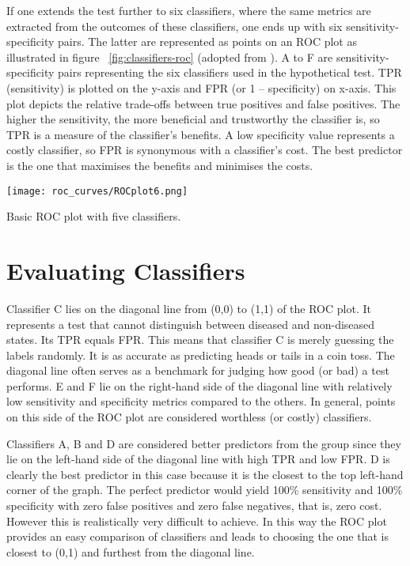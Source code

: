 If one extends the test further to six classifiers, where the same metrics are extracted from the outcomes of these classifiers, one ends up with six sensitivity-specificity pairs. The latter are represented as points on an ROC plot as illustrated in figure ~\ref{fig:classifiers-roc} (adopted from \citet{fawcett2006introroc}). A to F are sensitivity-specificity pairs representing the six classifiers used in the hypothetical test. TPR (sensitivity) is plotted on the y-axis and FPR (or 1 – specificity) on x-axis. This plot depicts the relative trade-offs between true positives and false positives. The higher the sensitivity, the more beneficial and trustworthy the classifier is, so TPR is a measure of the classifier's benefits. A low specificity value represents a costly classifier, so FPR is synonymous with a classifier's cost. The best predictor is the one that maximises the benefits and minimises the costs. 

\begin{marginfigure}
	\texttt{[image: roc\_curves/ROCplot6.png]}
	\caption{Basic ROC plot with five classifiers.}
	\label{fig:classifiers-roc}
\end{marginfigure}

\section{Evaluating Classifiers} 
Classifier C lies on the diagonal line from (0,0) to (1,1) of the ROC plot. It represents a test that cannot distinguish between diseased and non-diseased states. Its TPR equals FPR. This means that classifier C is merely guessing the labels randomly. It is as accurate as predicting heads or tails in a coin toss. The diagonal line often serves as a benchmark for judging how good (or bad) a test performs. E and F lie on the right-hand side of the diagonal line with relatively low sensitivity and specificity metrics compared to the others. In general, points on this side of the ROC plot are considered worthless (or costly) classifiers.

Classifiers A, B and D are considered better predictors from the group since they lie on the left-hand side of the diagonal line with high TPR and low FPR. D is clearly the best predictor in this case because it is the closest to the top left-hand corner of the graph. The perfect predictor would yield 100\% sensitivity and 100\% specificity with zero false positives and zero false negatives, that is, zero cost. However this is realistically very difficult to achieve. In this way the ROC plot provides an easy comparison of classifiers and leads to choosing the one that is closest to (0,1) and furthest from the diagonal line.

